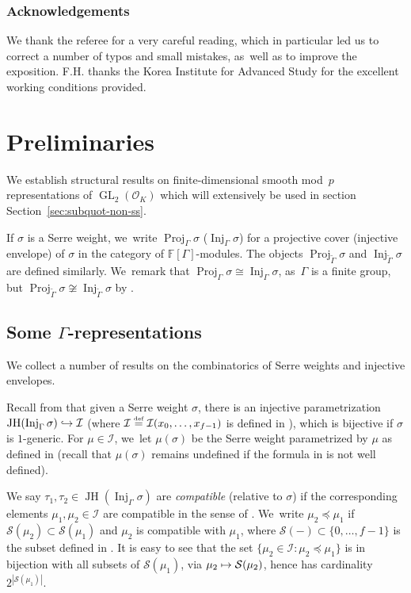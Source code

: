 \documentclass[JEP,XML,SOM,Unicode,NoFloatCountersInSection, NoEqCountersInSection,published]{cedram}
\newcommand\mto{\mathchoice{\longmapsto}{\mapsto}{\mapsto}{\mapsto}}
\newcommand\hto{\mathrel{\lhook\joinrel\to}}
\let\wt\widetilde
\newcommand{\defeq}{\stackrel{\textrm{\tiny{\upshape{def}}}}{=}}
\newcommand{\F}{\mathbb{F}}
\newcommand{\cI}{\mathcal{I}}
\newcommand{\cO}{\mathcal{O}}
\newcommand{\cS}{\mathcal{S}}
\DeclareMathOperator{\GL}{GL}
\DeclareMathOperator{\Inj}{Inj}
\DeclareMathOperator{\JH}{\mathrm{JH}}
\DeclareMathOperator{\Proj}{Proj}
\theoremstyle{plain}
\theoremstyle{definition}
\begin{document}
\subsubsection*{Acknowledgements}
We thank the referee for a very careful reading, which in particular led us to correct a number of typos and small mistakes, as~well as to improve the exposition. F.H. thanks the Korea Institute for Advanced Study for the excellent working conditions provided.

\section{Preliminaries}
\label{sec:prelims}
We establish structural results on finite-dimensional smooth mod~$p$ representations of $\GL_2(\cO_K)$ which will extensively be used in section Section~\ref{sec:subquot-non-ss}.

If $\sigma$ is a Serre weight, we~write $\Proj_\Gamma\sigma$ (\resp $\Inj_\Gamma\sigma$) for a projective cover (\resp injective envelope) of $\sigma$ in the category of $\F[\Gamma]$-modules.
The objects $\Proj_{\wt{\Gamma}}\sigma$ and $\Inj_{\wt{\Gamma}}\sigma$ are defined similarly. We~remark that $\Proj_\Gamma\sigma \cong \Inj_\Gamma\sigma$, as~$\Gamma$ is a finite group, but $\Proj_{\wt{\Gamma}}\sigma \not\cong \Inj_{\wt{\Gamma}}\sigma$ by \cite[(2.6), Prop.\,2.12]{HuWang2}.

\subsection{Some \texorpdfstring{$\Gamma$}{Gamma}-representations}
\label{sec:EG-Gamma-rep}

We collect a number of results on the combinatorics of Serre weights and injective envelopes.

Recall from \cite[\S 3]{BP} that given a Serre weight $\sigma$, there is an injective parametrization $\JH(\Inj_\Gamma\sigma)\hto \cI$ (where $\cI\defeq \cI(x_0,\dots,x_{f-1})$ is defined in \cite[\S 4]{BP}), which is bijective if $\sigma$ is $1$-generic. For $\mu\in\cI$, we~let $\mu(\sigma)$ be the Serre weight parametrized by $\mu$ as defined in \cite[(2.2)]{HuWang2} (recall that $\mu(\sigma)$ remains undefined if the formula in \loccit is not well defined).

We say $\tau_1,\tau_2\in \JH(\Inj_\Gamma\sigma)$ are \emph{compatible} (relative to $\sigma$) if the corresponding elements $\mu_1,\mu_2\in \cI$ are compatible in the sense of \cite[Def.\,4.10]{BP}. We~write $\mu_2\preceq \mu_1$ if $\cS(\mu_2)\subset \cS(\mu_1)$ and $\mu_2$ is compatible with $\mu_1$, where $\cS(-)\subset \{0,\dots,f-1\}$ is the subset defined in \cite[\S 4]{BP}.
{It is easy to see that the set $\{\mu_2\in\cI: \mu_2\preceq \mu_1\}$ is in bijection with all subsets of $\cS(\mu_1)$, via $\mu_2 \mto \cS(\mu_2)$, hence has cardinality $2^{|\cS(\mu_1)|}$.}
\end{document}
